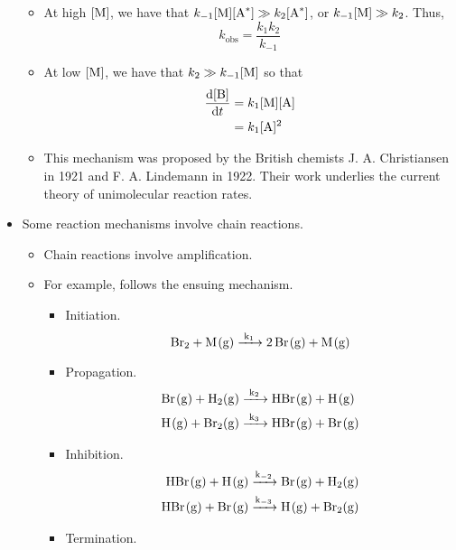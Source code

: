 \documentclass[../notes.tex]{subfiles}
\begin{document}
\begin{itemize}
\begin{itemize}
        \item At high $[\ce{M}]$, we have that $k_{-1}[\ce{M}][\ce{A^*}]\gg k_2[\ce{A^*}]$, or $k_{-1}[\ce{M}]\gg k_2$. Thus,
        \begin{equation*}
            k_\text{obs} = \frac{k_1k_2}{k_{-1}}
        \end{equation*}
        \item At low $[\ce{M}]$, we have that $k_2\gg k_{-1}[\ce{M}]$ so that
        \begin{align*}
            \dv{[\ce{B}]}{t} &= k_1[\ce{M}][\ce{A}]\\
            &= k_1[\ce{A}]^2
        \end{align*}
        \item This mechanism was proposed by the British chemists J. A. Christiansen in 1921 and F. A. Lindemann in 1922. Their work underlies the current theory of unimolecular reaction rates.
    \end{itemize}
    \item Some reaction mechanisms involve chain reactions.
    \begin{itemize}
        \item Chain reactions involve amplification.
        \item For example,  follows the ensuing mechanism.
        \begin{itemize}
            \item Initiation.
            \begin{equation*}
                \ce{Br2 + M(g) ->[k_1] 2Br(g) + M(g)}
            \end{equation*}
            \item Propagation.
            \begin{align*}
                \ce{Br(g) + H2(g)} &\ce{->[k_2]} \ce{HBr(g) + H(g)}\\
                \ce{H(g) + Br2(g)} &\ce{->[k_3]} \ce{HBr(g) + Br(g)}
            \end{align*}
            \item Inhibition.
            \begin{align*}
                \ce{HBr(g) + H(g)} &\ce{->[k_{-2}]} \ce{Br(g) + H2(g)}\\
                \ce{HBr(g) + Br(g)} &\ce{->[k_{-3}]} \ce{H(g) + Br2(g)}
            \end{align*}
            \item Termination.
            \begin{equation*}

\end{equation*}
\end{itemize}
\end{itemize}
\end{itemize}
\end{document}
